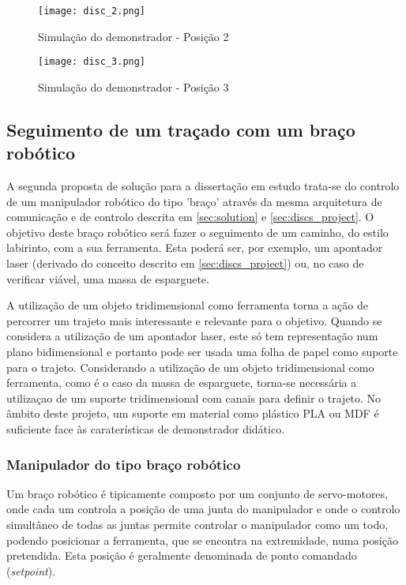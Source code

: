 \begin{figure}[htp]
 \centering
 \texttt{[image: disc\_2.png]}
 \caption{Simulação do demonstrador - Posição 2}
 \label{fig:discs2}
\end{figure}

\begin{figure}[htp]
 \centering
 \texttt{[image: disc\_3.png]}
 \caption{Simulação do demonstrador - Posição 3}
 \label{fig:discs3}
\end{figure}


\subsection{Seguimento de um traçado com um braço robótico}\label{sec:robotic_arm}

A segunda proposta de solução para a dissertação em estudo trata-se do
controlo de um manipulador robótico do tipo 'braço' através da mesma
arquitetura de comunicação e de controlo descrita em \ref{sec:solution} e
\ref{sec:discs_project}. O objetivo deste braço robótico será fazer o
seguimento de um caminho, do estilo labirinto, com a sua ferramenta.
Esta poderá ser, por exemplo, um apontador laser (derivado do conceito
descrito em \ref{sec:discs_project}) ou, no caso de verificar viável, uma
massa de esparguete.

A utilização de um objeto tridimensional como ferramenta torna a ação de
percorrer um trajeto mais interessante e relevante para o objetivo.
Quando se considera a utilização de um apontador laser, este só tem
representação num plano bidimensional e portanto pode ser usada uma folha
de papel como suporte para o trajeto. Considerando a utilização de um
objeto tridimensional como ferramenta, como é o caso da massa de
esparguete, torna-se necessária a utilizaçao de um suporte tridimensional
com canais para definir o trajeto. No âmbito deste projeto, um suporte
em material como plástico PLA ou MDF é suficiente face às caraterísticas
de demonstrador didático.

\subsubsection{Manipulador do tipo braço robótico}
Um braço robótico é tipicamente composto por um conjunto de servo-motores,
onde cada um controla a posição de uma junta do manipulador e onde o
controlo simultâneo de todas as juntas permite controlar o manipulador
como um todo, podendo posicionar a ferramenta, que se encontra na extremidade,
numa posição pretendida. Esta posição é geralmente denominada de ponto
comandado (\emph{setpoint}).

